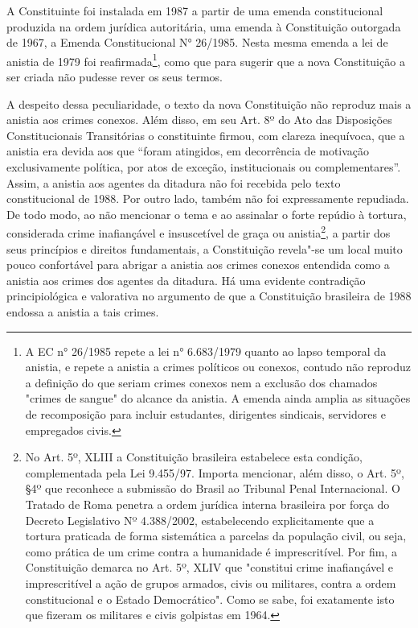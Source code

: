 A Constituinte foi instalada em 1987 a partir de uma emenda
constitucional produzida na ordem jurídica autoritária, uma emenda à
Constituição outorgada de 1967, a Emenda Constitucional N° 26/1985.
Nesta mesma emenda a lei de anistia de 1979 foi reafirmada\footnote{A EC
  n° 26/1985 repete a lei n° 6.683/1979 quanto ao lapso temporal da
  anistia, e repete a anistia a crimes políticos ou conexos, contudo não
  reproduz a definição do que seriam crimes conexos nem a exclusão dos
  chamados "crimes de sangue" do alcance da anistia. A emenda ainda
  amplia as situações de recomposição para incluir estudantes,
  dirigentes sindicais, servidores e empregados civis.}, como que para
sugerir que a nova Constituição a ser criada não pudesse rever os seus
termos.

A despeito dessa peculiaridade, o texto da nova Constituição não
reproduz mais a anistia aos crimes conexos. Além disso, em seu Art. 8º
do Ato das Disposições Constitucionais Transitórias o constituinte
firmou, com clareza inequívoca, que a anistia era devida aos que ``foram
atingidos, em decorrência de motivação exclusivamente política, por atos
de exceção, institucionais ou complementares''. Assim, a anistia aos
agentes da ditadura não foi recebida pelo texto constitucional de 1988.
Por outro lado, também não foi expressamente repudiada. De todo modo, ao
não mencionar o tema e ao assinalar o forte repúdio à tortura,
considerada crime inafiançável e insuscetível de graça ou
anistia\footnote{No Art. 5º, XLIII a Constituição brasileira estabelece
  esta condição, complementada pela Lei 9.455/97. Importa mencionar,
  além disso, o Art. 5º, §4º que reconhece a submissão do Brasil ao
  Tribunal Penal Internacional. O Tratado de Roma penetra a ordem
  jurídica interna brasileira por força do Decreto Legislativo Nº
  4.388/2002, estabelecendo explicitamente que a tortura praticada de
  forma sistemática a parcelas da população civil, ou seja, como prática
  de um crime contra a humanidade é imprescritível. Por fim, a
  Constituição demarca no Art. 5º, XLIV que "constitui crime
  inafiançável e imprescritível a ação de grupos armados, civis ou
  militares, contra a ordem constitucional e o Estado Democrático". Como
  se sabe, foi exatamente isto que fizeram os militares e civis
  golpistas em 1964.}, a partir dos seus princípios e direitos
fundamentais, a Constituição revela"-se um local muito pouco confortável
para abrigar a anistia aos crimes conexos entendida como a anistia aos
crimes dos agentes da ditadura. Há uma evidente contradição
principiológica e valorativa no argumento de que a Constituição
brasileira de 1988 endossa a anistia a tais crimes.


